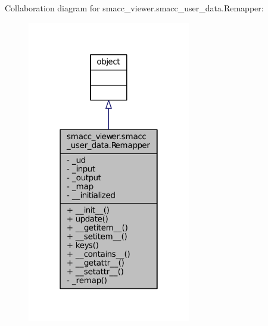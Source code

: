 Collaboration diagram for smacc\+\_\+viewer.\+smacc\+\_\+user\+\_\+data.\+Remapper\+:
\nopagebreak
\begin{figure}[H]
\begin{center}
\leavevmode
\includegraphics[width=202pt]{classsmacc__viewer_1_1smacc__user__data_1_1Remapper__coll__graph}
\end{center}
\end{figure}
